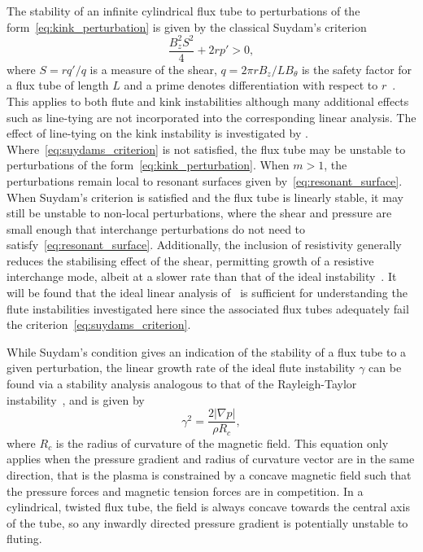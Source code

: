 \documentclass[fleqn,usenatbib]{mnras}
\newcommand{\revcite}[1]{{\color{red} \underline{#1}}}
\begin{document}
The stability of an infinite cylindrical flux tube to perturbations of the
form~\eqref{eq:kink_perturbation} is given by the classical Suydam's
criterion~\citep{suydamStabilityLinearPinch1958}
\begin{equation}
  \label{eq:suydams_criterion}
\frac{B_z^2 S^2}{4} + 2 r p' > 0,
\end{equation}
where $S = r q'/q$ is a measure of the shear, $q = 2\pi r B_z / L B_{\theta}$
is the safety factor for a flux tube of length $L$ and a prime denotes
differentiation with respect to
$r$~\citep{mikhailovskiiInstabilitiesConfinedPlasma1998}. This applies to both
flute and kink instabilities although many additional effects such as
line-tying are not incorporated into the corresponding linear analysis. The
effect of line-tying on the kink instability is investigated
by \revcite{\citet{hoodKinkInstabilitySolar1979}}. Where~\eqref{eq:suydams_criterion} is
not satisfied, the flux tube may be unstable to perturbations of the
form~\eqref{eq:kink_perturbation}. When $m>1$, the perturbations remain local
to resonant surfaces given by~\eqref{eq:resonant_surface}. When Suydam's
criterion is satisfied and the flux tube is linearly stable, it may still be
unstable to non-local perturbations, where the shear and pressure are small
enough that interchange perturbations do not need to
satisfy~\eqref{eq:resonant_surface}. Additionally, the inclusion of resistivity
generally reduces the stabilising effect of the shear, permitting growth of
a resistive interchange mode, albeit at a slower rate than that of the ideal
instability~\citep{mikhailovskiiInstabilitiesConfinedPlasma1998}. It will be
found that the ideal linear analysis
of~\cite{mikhailovskiiInstabilitiesConfinedPlasma1998} is sufficient for
understanding the flute instabilities investigated here since the associated
flux tubes adequately fail the criterion~\eqref{eq:suydams_criterion}.

While Suydam's condition gives an indication of the stability of a flux tube to
a given perturbation, the linear growth rate of the ideal flute instability
$\gamma$ can be found via a stability analysis analogous to that of the
Rayleigh-Taylor instability~\citep[][]{goldstonIntroductionPlasmaPhysics2020}, and is given by
\begin{equation}
  \label{eq:fluting_growth_rate}
\gamma^2 = \frac{2|\nabla p|}{\rho R_c},
\end{equation}
where $R_c$ is the radius of curvature of the magnetic field. This equation
only applies when the pressure gradient and radius of curvature vector are in
the same direction, that is the plasma is constrained by a concave magnetic
field such that the pressure forces and magnetic tension forces are in
competition. In a cylindrical, twisted flux tube, the field is always concave
towards the central axis of the tube, so any inwardly directed pressure
gradient is potentially unstable to fluting.
\end{document}
